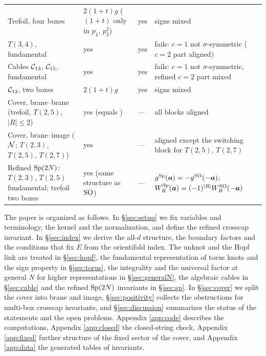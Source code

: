 \begin{table}[htbp]
\begin{tabular}{>{\raggedright\arraybackslash}p{5.0cm}>{\raggedright\arraybackslash}p{2.4cm}>{\raggedright\arraybackslash}p{2.0cm}>{\raggedright\arraybackslash}p{5.2cm}}
\addlinespace
Trefoil, four boxes & $2(1+t)g$ ($(1+t)$ only in $p_4$, $p_2^2$) & yes & signs mixed \\
\addlinespace
$T(3,4)$, fundamental & yes & yes & fails: $c = 1$ not $\sigma$-symmetric ($c = 2$ part aligned) \\
\addlinespace
Cables $\mathcal{C}_{13}$, $\mathcal{C}_{15}$, fundamental & yes & yes & fails: $c = 1$ not $\sigma$-symmetric, refined $c = 2$ part mixed \\
\addlinespace
$\mathcal{C}_{13}$, two boxes & $2(1+t)g$ & yes & signs mixed \\
\addlinespace
Cover, brane--brane (trefoil, $T(2,5)$, $|R| \le 2$) & yes (equals \cite{KN17}) & --- & all blocks aligned \\
\addlinespace
Cover, brane--image ($\mathcal{N}$; $T(2,3)$, $T(2,5)$, $T(2,7)$) & yes & --- & aligned except the switching block for $T(2,5)$, $T(2,7)$ \\
\addlinespace
Refined $\mathrm{Sp}(2N)$: $T(2,3)$, $T(2,5)$ fundamental; trefoil two boxes & yes (same structure as $\mathrm{SO}$) & --- & $g^{\mathrm{Sp}}(\bm{a}) = -g^{\mathrm{SO}}(-\bm{a})$; $W^{\mathrm{Sp}}_R(\bm{a}) = (-1)^{|R|}W^{\mathrm{SO}}_R(-\bm{a})$ \\
\bottomrule
\end{tabular}
\end{table}

The paper is organized as follows. In \S\ref{sec:setup} we fix variables and terminology, the kernel and the normalization, and define the refined crosscap invariant. In \S\ref{sec:index} we derive the all-$d$ structure, the boundary factors and the conditions that fix $E$ from the orientifold index. The unknot and the Hopf link are treated in \S\ref{sec:hopf}, the fundamental representation of torus knots and the sign property in \S\ref{sec:torus}, the integrality and the universal factor at general $N$ for higher representations in \S\ref{sec:generalN}, the algebraic cables in \S\ref{sec:cable} and the refined $\mathrm{Sp}(2N)$ invariants in \S\ref{sec:sp}. In \S\ref{sec:cover} we split the cover into brane and image, \S\ref{sec:positivity} collects the obstructions for multi-box crosscap invariants, and \S\ref{sec:discussion} summarizes the status of the statements and the open problems. Appendix \ref{app:code} describes the computations, Appendix \ref{app:closed} the closed-string check, Appendix \ref{app:fixed} further structure of the fixed sector of the cover, and Appendix \ref{app:data} the generated tables of invariants.
